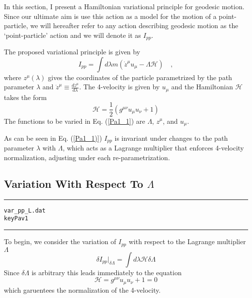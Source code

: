 \documentclass[12pt]{article}
\begin{document}
In this section, I present a Hamiltonian variational principle
for geodesic motion. Since our ultimate aim is use
this action as a model for the motion of a point-particle, we
will hereafter refer to any action describing geodesic motion
as the `point-particle' action and we will denote it
as $ I_{pp} $.

The proposed variational principle is
given by
\begin{equation}\label{Pa1_1}
I_{pp} = \int d \lambda m \left( {\dot z}^{\mu} {u}_{\mu} - \Lambda \mathcal{H} \right) \quad ,
\end{equation}
where $ {z ^ \mu} \left( \lambda \right) $ gives the coordinates of the particle
parametrized by the path parameter $ \lambda $ and
$ {\dot z}^{\mu} \equiv \frac{ d {z^ \mu } }{ d \lambda } $.
The 4-velocity is given by $ {u}_{\mu} $ and the Hamiltonian $ \mathcal{ H } $
takes the form
\begin{equation}\label{Pa1_2}
\mathcal{H} = \frac{1}{2} \left( {g}^{\mu \nu} {u}_{\mu} {u}_{\nu} + 1 \right)
\end{equation}
The functions to be varied in Eq. (\ref{Pa1_1}) are $ \Lambda $, $ {z ^ \mu} $,
and $ {u}_{\mu} $.

As can be seen in Eq. (\ref{Pa1_1)}) $ I_{pp} $ is invariant under changes
to the path parameter $ \lambda $ with $ \Lambda $, which acts as a Lagrange multiplier
that enforces 4-velocity normalization, adjusting under each
re-parametrization.


\subsection{Variation With Respect To $ \Lambda $}

\clearpage
\vspace{5mm}
\hrule
\begin{alltt}
  var_pp_L.dat
  key Pav1
\end{alltt}
\hrule
\vspace{5mm}

To begin, we consider the variation of $ I_{pp} $ with respect to the
Lagrange multiplier $ \Lambda $
\begin{equation}\label{Pav1_1}
{ \delta I_{pp} } |_{\delta \Lambda } = \int d \lambda \mathcal{H} \delta \Lambda
\end{equation}
Since $ \delta \Lambda $ is arbitrary this leads immediately to the equation
\begin{equation}\label{Pav1_2}
\mathcal{ H } = {g}^{\mu \nu} {u}_{\mu} {u}_{\nu} + 1 = 0
\end{equation}
which garuentees the normalization of the 4-velocity.
\end{document}
